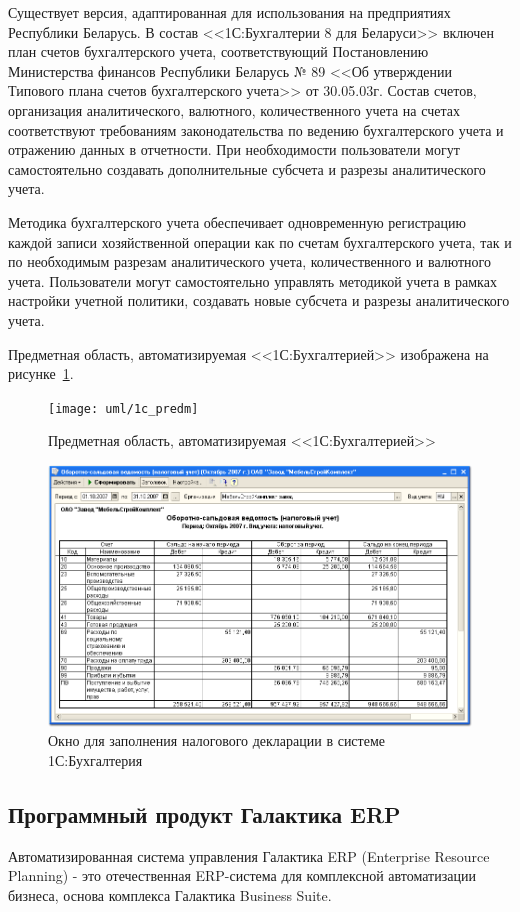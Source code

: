 \documentclass[14pt,a4paper]{reportmod}
\begin{document}
Существует версия, адаптированная для использования на предприятиях Республики Беларусь. В состав <<1С:Бухгалтерии 8 для Беларуси>> включен план счетов бухгалтерского учета, соответствующий Постановлению Министерства финансов Республики Беларусь № 89 <<Об утверждении Типового плана счетов бухгалтерского учета>> от 30.05.03г.  Состав счетов, организация аналитического, валютного, количественного учета на счетах соответствуют требованиям законодательства по ведению бухгалтерского учета и отражению данных в отчетности. При необходимости пользователи могут самостоятельно создавать дополнительные субсчета и разрезы аналитического учета.


Методика бухгалтерского учета обеспечивает одновременную регистрацию каждой записи хозяйственной операции как по счетам бухгалтерского учета, так и по необходимым разрезам аналитического учета, количественного и валютного учета. Пользователи могут самостоятельно управлять методикой учета в рамках настройки учетной политики, создавать новые субсчета и разрезы аналитического учета.


Предметная область, автоматизируемая <<1С:Бухгалтерией>> изображена на рисунке~\ref{pic:1c_image1}.


\begin{figure}
  \centering
  \texttt{[image: uml/1c\_predm]}
  \caption{Предметная область, автоматизируемая <<1С:Бухгалтерией>>}
  \label{pic:1c_image1}
\end{figure}


\begin{figure}
  \centering
  \includegraphics[scale=0.5]{pics/1c_image2}
  \caption{Окно для заполнения налогового декларации в системе 1С:Бухгалтерия}
  \label{pic:1c_image2}
\end{figure}
\subsection{Программный продукт Галактика ERP}
Автоматизированная система управления Галактика ERP (Enterprise Resource Planning) - это отечественная ERP-система для комплексной автоматизации бизнеса, основа комплекса Галактика Business Suite.
\end{document}
